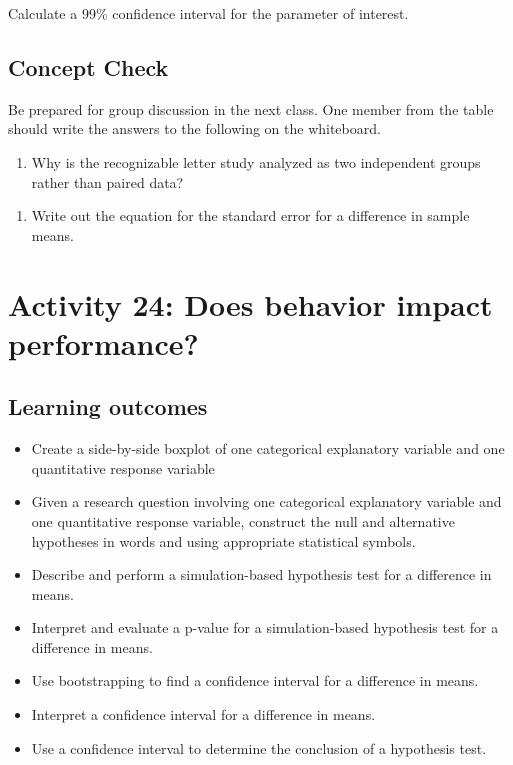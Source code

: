 \documentclass[
]{report}
\providecommand{\tightlist}{%
  \setlength{\itemsep}{0pt}\setlength{\parskip}{0pt}}
\begin{document}
Calculate a 99\% confidence interval for the parameter of interest.

\vspace{0.6in}

\subsection{Concept Check}\label{concept-check}

Be prepared for group discussion in the next class. One member from the table should write the answers to the following on the whiteboard.

\begin{enumerate}
\def\labelenumi{\arabic{enumi}.}
\tightlist
\item
  Why is the recognizable letter study analyzed as two independent groups rather than paired data?
\end{enumerate}

\vspace{0.6in}

\begin{enumerate}
\def\labelenumi{\arabic{enumi}.}
\setcounter{enumi}{1}
\tightlist
\item
  Write out the equation for the standard error for a difference in sample means.
\end{enumerate}

\vspace{1in}

\newpage

\section{Activity 24: Does behavior impact performance?}\label{activity-24-does-behavior-impact-performance}


\subsection{Learning outcomes}\label{learning-outcomes}

\begin{itemize}
\item
  Create a side-by-side boxplot of one categorical explanatory variable and one quantitative response variable
\item
  Given a research question involving one categorical explanatory variable and one quantitative response variable, construct the null and alternative hypotheses
  in words and using appropriate statistical symbols.
\item
  Describe and perform a simulation-based hypothesis test for a difference in means.
\item
  Interpret and evaluate a p-value for a simulation-based hypothesis test for a difference in means.
\item
  Use bootstrapping to find a confidence interval for a difference in means.
\item
  Interpret a confidence interval for a difference in means.
\item
  Use a confidence interval to determine the conclusion of a hypothesis test.
\end{itemize}
\end{document}
